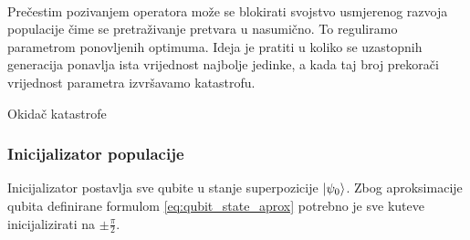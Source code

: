 \documentclass[times, utf8, zavrsni, numeric]{fer}
\begin{document}
\paragraph{}
Prečestim pozivanjem operatora može se blokirati svojstvo usmjerenog razvoja populacije čime se pretraživanje pretvara u nasumično. To reguliramo parametrom ponovljenih optimuma. Ideja je pratiti u koliko se uzastopnih generacija ponavlja ista vrijednost najbolje jedinke, a kada taj broj prekorači vrijednost parametra izvršavamo katastrofu.
\begin{algorithm}
\caption{Okidač katastrofe}
\label{algo:katastrofa_okidac}
\begin{algorithmic}
 
\ELSE
{}
\ENDIF
{}
\end{algorithmic}
\end{algorithm}

\subsubsection{Inicijalizator populacije}
Inicijalizator postavlja sve qubite u stanje superpozicije $\ket{\psi_0}$.
 Zbog aproksimacije qubita definirane formulom \ref{eq:qubit_state_aprox} potrebno je sve kuteve inicijalizirati na $\pm\frac{\pi}{2}$.
 
\end{document}
